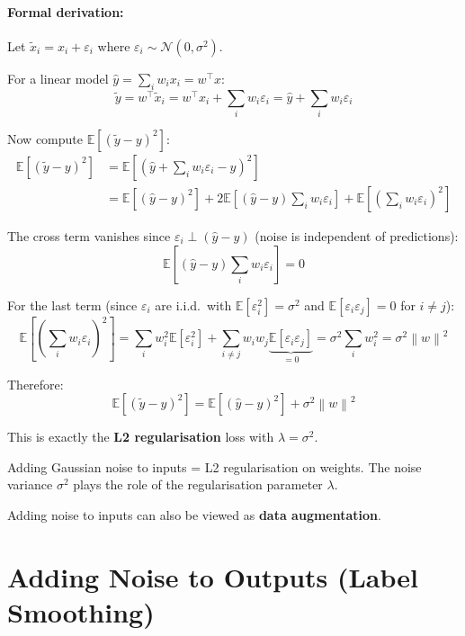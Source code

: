 \documentclass[12pt,a4paper]{article}
\newcommand{\E}{\mathbb{E}}
\newcommand{\norm}[1]{\left\|#1\right\|}
\begin{document}
\paragraph{Formal derivation:} Let $\tilde{x}_i = x_i + \varepsilon_i$ where $\varepsilon_i \sim \mathcal{N}(0, \sigma^2)$.

For a linear model $\hat{y} = \sum_i w_i x_i = w^\top x$:
\[
  \tilde{y} = w^\top\tilde{x}_i = w^\top x_i + \sum_i w_i\varepsilon_i
  = \hat{y} + \sum_i w_i\varepsilon_i
\]

Now compute $\E[(\tilde{y}-y)^2]$:
\begin{align*}
  \E[(\tilde{y}-y)^2]
  &= \E\!\left[\left(\hat{y} + \sum_i w_i\varepsilon_i - y\right)^2\right]\\
  &= \E[(\hat{y}-y)^2]
    + 2\E\!\left[(\hat{y}-y)\sum_i w_i\varepsilon_i\right]
    + \E\!\left[\left(\sum_i w_i\varepsilon_i\right)^2\right]
\end{align*}

The cross term vanishes since $\varepsilon_i \perp (\hat{y}-y)$ (noise is independent of predictions):
\[
  \E\!\left[(\hat{y}-y)\sum_i w_i\varepsilon_i\right] = 0
\]

For the last term (since $\varepsilon_i$ are i.i.d.\ with $\E[\varepsilon_i^2]=\sigma^2$ and $\E[\varepsilon_i\varepsilon_j]=0$ for $i\neq j$):
\[
  \E\!\left[\left(\sum_i w_i\varepsilon_i\right)^2\right]
  = \sum_i w_i^2\E[\varepsilon_i^2] + \sum_{i\neq j}w_iw_j\underbrace{\E[\varepsilon_i\varepsilon_j]}_{=0}
  = \sigma^2\sum_i w_i^2
  = \sigma^2\norm{w}^2
\]

Therefore:
\[
  \boxed{
    \E[(\tilde{y}-y)^2]
    = \E[(\hat{y}-y)^2] + \sigma^2\norm{w}^2
  }
\]

This is exactly the \textbf{L2 regularisation} loss with $\lambda = \sigma^2$.

\begin{keybox}
Adding Gaussian noise to inputs = L2 regularisation on weights. The noise variance $\sigma^2$ plays the role of the regularisation parameter $\lambda$.
\end{keybox}

Adding noise to inputs can also be viewed as \textbf{data augmentation}.

\section{Adding Noise to Outputs (Label Smoothing)}
\end{document}
